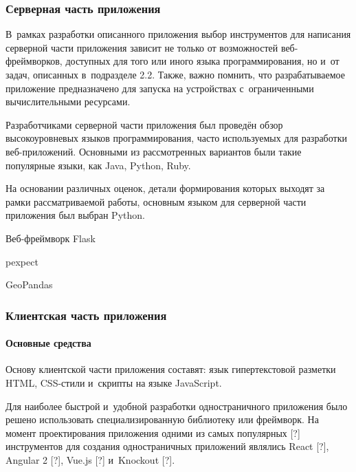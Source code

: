 \subsubsection{Серверная часть приложения}
\label{subsec:backend-tools}

В~рамках разработки описанного приложения выбор инструментов для написания серверной части приложения зависит не только от возможностей веб-фреймворков, доступных для того или иного языка программирования, но и~от задач, описанных в~подразделе 2.2. Также, важно помнить, что разрабатываемое приложение предназначено для запуска на устройствах с~ограниченными вычислительными ресурсами. \par

Разработчиками серверной части приложения был проведён обзор высокоуровневых языков программирования, часто используемых для разработки веб-приложений. Основными из рассмотренных вариантов были такие популярные языки, как Java, Python, Ruby. \par

На основании различных оценок, детали формирования которых выходят за рамки рассматриваемой работы, основным языком для серверной части приложения был выбран Python.

\begin{dashitemize}
  \item Веб-фреймворк Flask
  \item pexpect
  \item GeoPandas
\end{dashitemize}

\subsubsection{Клиентская часть приложения}
\label{subsec:frontend-tools}

\paragraph{Основные средства}

Основу клиентской части приложения составят: язык гипертекстовой разметки HTML, CSS-стили и~скрипты на языке JavaScript.

Для наиболее быстрой и~удобной разработки одностраничного приложения было решено использовать специализированную библиотеку или фреймворк. На момент проектирования приложения одними из самых популярных [?] инструментов для создания одностраничных приложений являлись React [?], Angular 2 [?], Vue.js [?] и~Knockout [?].

